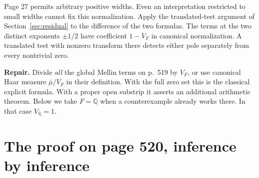 \documentclass[11pt,letterpaper]{article}
\newcommand{\Q}{\mathbb Q}
\newcommand{\head}[1]{\par\smallskip\textbf{#1}\enspace}
\begin{document}
Page 27 permits arbitrary positive widths. Even an interpretation restricted to small widths cannot fix this normalization. Apply the translated-test argument of Section~\ref{sec:residual} to the difference of the two formulas. The terms at the two distinct exponents $\pm1/2$ have coefficient $1-V_F$ in canonical normalization. A translated test with nonzero transform there detects either pole separately from every nontrivial zero.

\head{Repair.} Divide \emph{all} the global Mellin terms on p.~519 by $V_F$, or use canonical Haar measure $\bar\mu/V_F$ in their definition. With the full zero set this is the classical explicit formula. With a proper open substrip it asserts an additional arithmetic theorem. Below we take $F=\Q$ when a counterexample already works there. In that case $V_\Q=1$.

\section{The proof on page 520, inference by inference}\label{sec:main}
\end{document}
